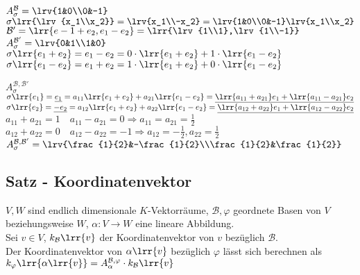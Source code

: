 			$A_{\sigma}^{\mathcal{B}}=\lrv{1&0\\0&-1}$\\
			$\sigma\lrr{\lrv{x_1\\x_2}}=\lrv{x_1\\-x_2}=\lrv{1&0\\0&-1}\lrv{x_1\\x_2}$\\
			$\mathcal{B}'=\lrr{e-1+e_2, e_1-e_2}=\lrr{\lrv{1\\1},\lrv{1\\-1}}$\\
			$A_\sigma^{\mathcal{B}'}=\lrv{0&1\\1&0}$\\
			$\sigma\lrr{e_1+e_2}=e_1-e_2=0\cdot\lrr{e_1+e_2}+1\cdot\lrr{e_1-e_2}$\\
			$\sigma\lrr{e_1-e_2}=e_1+e_2=1\cdot\lrr{e_1+e_2}+0\cdot\lrr{e_1-e_2}$

			$A_\sigma^{\mathcal{B},\mathcal{B}'}$\\
			$\sigma\lrr{e_1}=\underline{e_1}=a_{11}\lrr{e_1+e_2}+a_{21}\lrr{e_1-e_2}=\underline{\lrr{a_{11}+a_{21}}e_1+\lrr{a_{11}-a_{21}}e_2}$\\
			$\sigma\lrr{e_2}=\underline{-e_2}=a_{12}\lrr{e_1+e_2}+a_{22}\lrr{e_1-e_2}=\underline{\lrr{a_{12}+a_{22}}e_1+\lrr{a_{12}-a_{22}}e_2}$\\
			$a_{11}+a_{21}=1\quad a_{11}-a_{21}=0\Rightarrow a_{11}=a_{21}=\frac{1}{2}$\\
			$a_{12}+a_{22}=0\quad a_{12}-a_{22}=-1\Rightarrow a_{12}=-\frac{1}{2},a_{22}=\frac{1}{2}$\\
			$A_\sigma^{\mathcal{B},\mathcal{B}'}=\lrv{\frac{1}{2}&-\frac{1}{2}\\\frac{1}{2}&\frac{1}{2}}$
	\subExEnd

\subsection{Satz - Koordinatenvektor}
	$V,W$ sind endlich dimensionale $K$-Vektorräume, $\mathcal{B},\varphi$ geordnete Basen von $V$\\
	beziehungsweise $W$, $\alpha:V\rightarrow W$ eine lineare Abbildung.\\
	Sei $v\in V$, $k_{\mathcal{B}}\lrr{v}$ der Koordinatenvektor von $v$ bezüglich $\mathcal{B}$.\\
	Der Koordinatenvektor von $\alpha\lrr{v}$ bezüglich $\varphi$ lässt sich berechnen als\\
	$k_\varphi\lrr{\alpha\lrr{v}}=A_{\alpha}^{\mathcal{B},\varphi}\cdot k_\mathcal{B}\lrr{v}$

